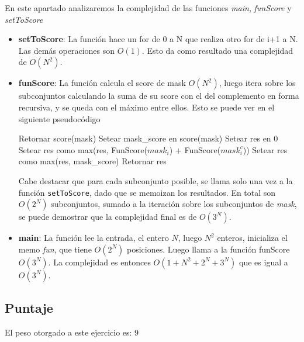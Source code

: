 En este apartado analizaremos la complejidad de las funciones \textit{main}, \textit{funScore} y \textit{setToScore}

\begin{itemize}
	\item \textbf{setToScore}: La funci\'on hace un for de 0 a N que realiza otro for de i+1 a N. Las dem\'as operaciones son $O(1)$. Esto da como resultado una complejidad de $O(N^2)$.

	\item \textbf{funScore}: La funci\'on calcula el score de mask $O(N^2)$, luego itera sobre los subconjuntos calculando la suma de su score con el del complemento en forma recursiva, y se queda con el m\'aximo entre ellos. Esto se puede ver en el siguiente pseudoc\'odigo

\begin{algorithmic}
		 Retornar score(mask)
		\EndIf
		\State Setear mask\_score en score(mask)
		\State Setear res en 0
			\State Setear res como max(res, FunScore($mask_i$) + FunScore($mask_i^c$))
		\EndFor
		\State Setear res como max(res, mask\_score)
		\State Retornar res
	\EndFunction
\end{algorithmic}

	Cabe destacar que para cada subconjunto posible, se llama solo una vez a la funci\'on \texttt{setToScore}, dado que se memoizan los resultados. En total son $O(2^N)$ subconjuntos, sumado a la iteraci\'on sobre los subconjuntos de \textit{mask}, se puede demostrar que la complejidad final es de $O(3^N)$.

	\item \textbf{main}: La funci\'on lee la entrada, el entero $N$, luego $N^2$ enteros, inicializa el memo \textit{fun}, que tiene $O(2^N)$ posiciones. Luego llama a la funci\'on funScore $O(3^N)$. La complejidad es entonces $O(1 + N^2 + 2^N + 3^N)$ que es igual a $O(3^N)$.
\end{itemize}

\subsection{Puntaje}
El peso otorgado a este ejercicio es: 9